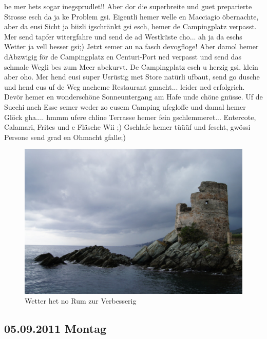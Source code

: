 be mer hets sogar inegsprudlet!! Aber dor die superbreite und guet preparierte Strosse esch da ja ke Problem gsi.
Eigentli hemer welle en Macciagio öbernachte, aber da eusi Sicht ja biizli igschränkt gsi esch, hemer de Campingplatz verpasst.
Mer send tapfer witergfahre und send de ad Westküste cho...
ah ja da eschs Wetter ja vell besser gsi;) Jetzt semer au na fasch devogfloge! Aber damol hemer dAbzwigig för de Campingplatz en Centuri-Port ned verpasst und send das schmale Wegli bes zum Meer abekurvt.
De Campingplatz esch u herzig gsi, klein aber oho.
Mer hend eusi super Usrüstig met Store natürli ufbaut, send go dusche und hend eus uf de Weg nacheme Restaurant gmacht...
leider ned erfolgrich.
Devör hemer en wonderschöne Sonneuntergang am Hafe unde chöne gnüsse.
Uf de Suechi nach Esse semer weder zo eusem Camping ufegloffe und damal hemer Glöck gha....
hmmm ufere chline Terrasse hemer fein gschlemmeret...
Entercote, Calamari, Frites und e Fläsche Wii ;) Gschlafe hemer tüüüf und fescht, gwössi Persone send grad en Ohmacht gfalle;)

\begin{figure}[hb]
    \centering
    \includegraphics[width=\textwidth]{../Bilder/Korsika/4.jpg}
    \caption{Wetter het no Rum zur Verbesserig}
    \label{img:Korsika1}
\end{figure}

\pagebreak

\subsection{05.09.2011 Montag}

